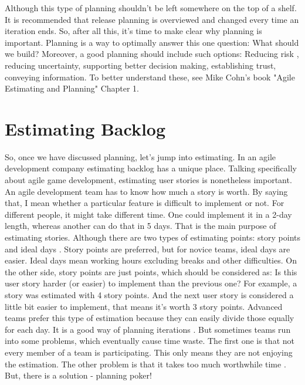 \documentclass{scrartcl}
\begin{document}
\begin{multicols}{2}
Although this type of planning shouldn't be left somewhere on the top of a shelf.
It is recommended that release planning is overviewed and changed every time an iteration ends.
So, after all this, it's time to make clear why planning is important.
Planning is a way to optimally answer this one question: What should we build? \cite{cohn2005agile}
Moreover, a good planning should include such options:
Reducing risk \cite{grapenthin2016supporting}, reducing uncertainty, supporting better decision making, establishing trust, conveying information.
To better understand these, see Mike Cohn's book "Agile Estimating and Planning" Chapter 1.

\section{Estimating Backlog}
So, once we have discussed planning, let's jump into estimating.
In an agile development company estimating backlog has a unique place.
Talking specifically about agile game development, estimating user stories is nonetheless important.
An agile development team has to know how much a story is worth.
By saying that, I mean whether a particular feature is difficult to implement or not.
For different people, it might take different time.
One could implement it in a 2-day length, whereas another can do that in 5 days.
That is the main purpose of estimating stories.
Although there are two types of estimating points: story points and ideal days \cite{cohn2005agile}.
Story points are preferred, but for novice teams, ideal days are easier.
Ideal days mean working hours excluding breaks and other difficulties.
On the other side, story points are just points, which should be considered as:
Is this user story harder (or easier) to implement than the previous one?
For example, a story was estimated with 4 story points.
And the next user story is considered a little bit easier to implement, that means it's worth 3 story points.
Advanced teams prefer this type of estimation because they can easily divide those equally for each day.
It is a good way of planning iterations \cite{haugen2006empirical}.
But sometimes teams run into some problems, which eventually cause time waste.
The first one is that not every member of a team is participating.
This only means they are not enjoying the estimation.
The other problem is that it takes too much worthwhile time \cite{cunningham2005costs}.
But, there is a solution - planning poker!


\end{multicols}
\end{document}
